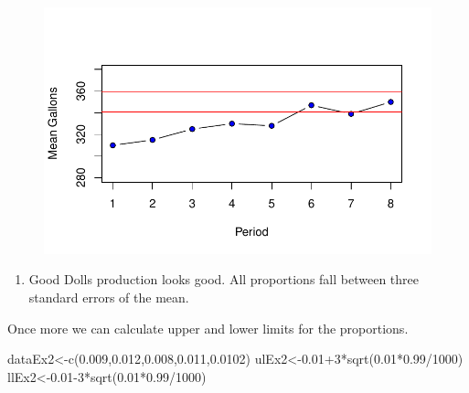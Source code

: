 \documentclass[
  letterpaper,
  DIV=11,
  numbers=noendperiod]{scrreprt}
\newenvironment{Shaded}{\begin{snugshade}}{\end{snugshade}}
\newcommand{\DecValTok}[1]{\textcolor[rgb]{0.68,0.00,0.00}{#1}}
\newcommand{\FloatTok}[1]{\textcolor[rgb]{0.68,0.00,0.00}{#1}}
\newcommand{\FunctionTok}[1]{\textcolor[rgb]{0.28,0.35,0.67}{#1}}
\newcommand{\NormalTok}[1]{\textcolor[rgb]{0.00,0.23,0.31}{#1}}
\newcommand{\OtherTok}[1]{\textcolor[rgb]{0.00,0.23,0.31}{#1}}
\newcommand{\SpecialCharTok}[1]{\textcolor[rgb]{0.37,0.37,0.37}{#1}}
\providecommand{\tightlist}{%
  \setlength{\itemsep}{0pt}\setlength{\parskip}{0pt}}\usepackage{longtable,booktabs,array}
\begin{document}
\begin{figure}[H]

{\centering \includegraphics{./12-InferenceI_files/figure-pdf/unnamed-chunk-20-1.pdf}

}

\end{figure}

\begin{blackbox}

\begin{enumerate}
\def\labelenumi{\arabic{enumi}.}
\setcounter{enumi}{1}
\tightlist
\item
  Good Dolls production looks good. All proportions fall between three
  standard errors of the mean.
\end{enumerate}

\end{blackbox}

Once more we can calculate upper and lower limits for the proportions.

\begin{Shaded}
\begin{Highlighting}[numbers=left,,]
\NormalTok{dataEx2}\OtherTok{\textless{}{-}}\FunctionTok{c}\NormalTok{(}\FloatTok{0.009}\NormalTok{,}\FloatTok{0.012}\NormalTok{,}\FloatTok{0.008}\NormalTok{,}\FloatTok{0.011}\NormalTok{,}\FloatTok{0.0102}\NormalTok{)}
\NormalTok{ulEx2}\OtherTok{\textless{}{-}}\FloatTok{0.01}\SpecialCharTok{+}\DecValTok{3}\SpecialCharTok{*}\FunctionTok{sqrt}\NormalTok{(}\FloatTok{0.01}\SpecialCharTok{*}\FloatTok{0.99}\SpecialCharTok{/}\DecValTok{1000}\NormalTok{)}
\NormalTok{llEx2}\OtherTok{\textless{}{-}}\FloatTok{0.01}\DecValTok{{-}3}\SpecialCharTok{*}\FunctionTok{sqrt}\NormalTok{(}\FloatTok{0.01}\SpecialCharTok{*}\FloatTok{0.99}\SpecialCharTok{/}\DecValTok{1000}\NormalTok{)}
\end{Highlighting}
\end{Shaded}
\end{document}
